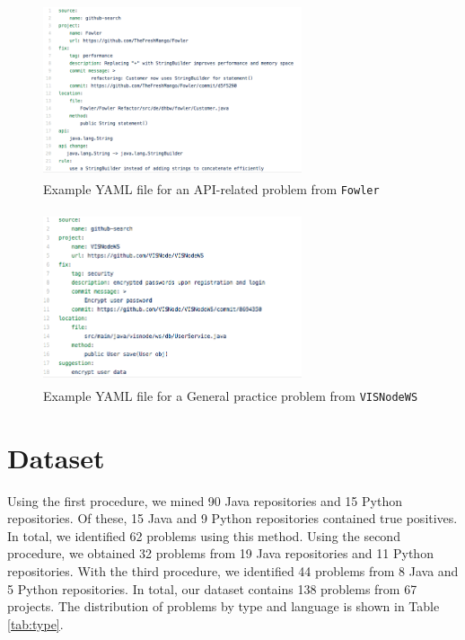\documentclass[sigconf]{acmart}
\begin{document}
\begin{figure}
  \includegraphics[height=2in, width=3in]{YAMLmetadata}
  \caption{Example YAML file for an API-related problem from \texttt{Fowler}}
  \label{fig:meta1}
\end{figure}


\begin{figure}
  \includegraphics[height=2in, width=3in]{YAMLmetadata2}
  \caption{Example YAML file for a General practice problem from \texttt{VISNodeWS}}
  \label{fig:meta2}
\end{figure}

\section{Dataset}

Using the first procedure, we mined 90 Java repositories and 15 Python repositories. Of these, 15 Java and 9 Python repositories contained true positives. In total, we identified 62 problems using this method. Using the second procedure, we obtained 32 problems from 19 Java repositories and 11 Python repositories. With the third procedure, we identified 44 problems from 8 Java and 5 Python repositories. In total, our dataset contains 138 problems from 67 projects. The distribution of problems by type and language is shown in Table \ref{tab:type}.
\end{document}
